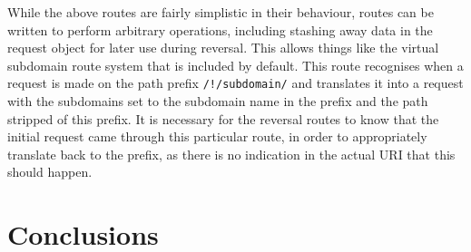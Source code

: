 \documentclass{sig-alternate-05-2015}
\begin{document}
While the above routes are fairly simplistic in their behaviour, routes can be written to perform arbitrary operations, including stashing away data in the request object for later use during reversal. This allows things like the virtual subdomain route system that is included by default. This route recognises when a request is made on the path prefix \texttt{/!/subdomain/} and translates it into a request with the subdomains set to the subdomain name in the prefix and the path stripped of this prefix. It is necessary for the reversal routes to know that the initial request came through this particular route, in order to appropriately translate back to the prefix, as there is no indication in the actual URI that this should happen. \\

\section{Conclusions}



\end{document}
